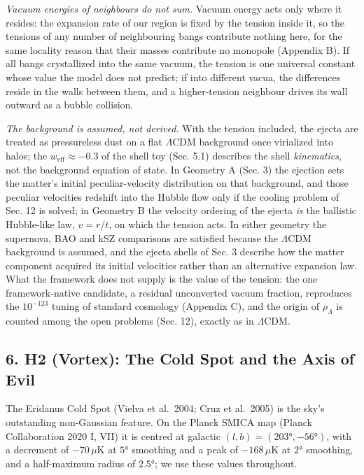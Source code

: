 \documentclass[
]{article}
\begin{document}
\emph{Vacuum energies of neighbours do not sum.} Vacuum energy acts only
where it resides: the expansion rate of our region is fixed by the
tension inside it, so the tensions of any number of neighbouring bangs
contribute nothing here, for the same locality reason that their masses
contribute no monopole (Appendix B). If all bangs crystallized into the
same vacuum, the tension is one universal constant whose value the model
does not predict; if into different vacua, the differences reside in the
walls between them, and a higher-tension neighbour drives its wall
outward as a bubble collision.

\emph{The background is assumed, not derived.} With the tension
included, the ejecta are treated as pressureless dust on a flat
\(\Lambda\)CDM background once virialized into halos; the
\(w_{\text{eff}} \approx -0.3\) of the shell toy (Sec. 5.1) describes
the shell \emph{kinematics}, not the background equation of state. In
Geometry A (Sec. 3) the ejection sets the matter's initial
peculiar-velocity distribution on that background, and those peculiar
velocities redshift into the Hubble flow only if the cooling problem of
Sec. 12 is solved; in Geometry B the velocity ordering of the ejecta
\emph{is} the ballistic Hubble-like law, \(v = r/t\), on which the
tension acts. In either geometry the supernova, BAO and kSZ comparisons
are satisfied because the \(\Lambda\)CDM background is assumed, and the
ejecta shells of Sec. 3 describe how the matter component acquired its
initial velocities rather than an alternative expansion law. What the
framework does not supply is the value of the tension: the one
framework-native candidate, a residual unconverted vacuum fraction,
reproduces the \(10^{-123}\) tuning of standard cosmology (Appendix C),
and the origin of \(\rho_\Lambda\) is counted among the open problems
(Sec. 12), exactly as in \(\Lambda\)CDM.

\hypertarget{h2-vortex-the-cold-spot-and-the-axis-of-evil}{%
\subsection{\texorpdfstring{\textbf{6. H2 (Vortex): The Cold Spot and
the Axis of
Evil}}{6. H2 (Vortex): The Cold Spot and the Axis of Evil}}\label{h2-vortex-the-cold-spot-and-the-axis-of-evil}}

The Eridanus Cold Spot (Vielva et al.~2004; Cruz et al.~2005) is the
sky's outstanding non-Gaussian feature. On the Planck SMICA map (Planck
Collaboration 2020 I, VII) it is centred at galactic
\((l, b) = (203°, -56°)\), with a decrement of \(-70\,\mu\)K at \(5°\)
smoothing and a peak of \(-168\,\mu\)K at \(2°\) smoothing, and a
half-maximum radius of \(2.5°\); we use these values throughout.
\end{document}
